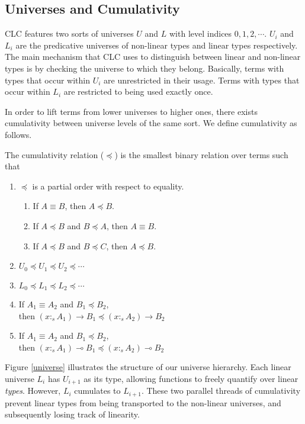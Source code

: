 \documentclass[sigplan,screen,review,anonymous]{acmart}
\newcommand{\stype}[1]{:_#1}
\begin{document}
\subsection{Universes and Cumulativity}
CLC features two sorts of universes $U$ and $L$ with level indices $0, 1, 2, \cdots$. $U_i$ and $L_i$ are the predicative universes of non-linear types and linear types respectively. The main mechanism that CLC uses to distinguish between linear and non-linear types is by checking the universe to which they belong. Basically, terms with types that occur within $U_i$ are unrestricted in their usage. Terms with types that occur within $L_i$ are restricted to being used exactly once.

In order to lift terms from lower universes to higher ones, there exists cumulativity between universe levels of the same sort. We define cumulativity as follows.

\begin{definition}
  The cumulativity relation ($\preceq$) is the smallest binary relation over terms such that
  \begin{enumerate}
    \item $\preceq$ is a partial order with respect to equality.
          \begin{enumerate}
            \item If $A \equiv B$, then $A \preceq B$.
            \item If $A \preceq B$ and $B \preceq A$, then $A \equiv B$.
            \item If $A \preceq B$ and $B \preceq C$, then $A \preceq B$.
          \end{enumerate}
    \item $U_0 \preceq U_1 \preceq U_2 \preceq \cdots$
    \item $L_0 \preceq L_1 \preceq L_2 \preceq \cdots$
    \item If $A_1 \equiv A_2$ and $B_1 \preceq B_2$, \\ then
          $(x \stype{s} A_1) \rightarrow B_1 \preceq (x \stype{s} A_2) \rightarrow B_2$
    \item If $A_1 \equiv A_2$ and $B_1 \preceq B_2$, \\ then
          $(x \stype{s} A_1) \multimap B_1 \preceq (x \stype{s} A_2) \multimap B_2$
  \end{enumerate}
\end{definition}

Figure \ref{universe} illustrates the structure of our universe hierarchy. Each linear universe $L_i$ has $U_{i+1}$ as its type, allowing functions to freely quantify over linear \textit{types}. However, $L_i$ cumulates to $L_{i+1}$. These two parallel threads of cumulativity prevent linear types from being transported to the non-linear universes, and subsequently losing track of linearity.
\end{document}
